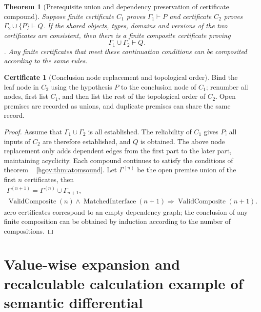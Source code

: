 \documentclass[12pt,a4paper,openany,notitlepage]{report}
\theoremstyle{plain}
\newtheorem{theorem}{Theorem}[chapter]
\theoremstyle{definition}
\newtheorem*{certificate}{Certificate}
\theoremstyle{remark}
\def\mathcal#1{#1}\def\mathsf#1{#1}\def\mathbb#1{#1}%
\begin{document}
\begin{CJK*}
\begin{theorem}
[Prerequisite union and dependency preservation of certificate compound]\label{exp:logic:certificate-composition}
Suppose finite certificate $\mathcal C_1$ proves $\Gamma_1\vdash P$ and certificate $\mathcal C_2$ proves $\Gamma_2\cup\{P\}\vdash Q$. If the shared objects, types, domains and versions of the two certificates are consistent, then there is a finite composite certificate proving \[
 \Gamma_1\cup\Gamma_2\vdash Q.
\]. Any finite certificates that meet these continuation conditions can be composited according to the same rules.\end{theorem}
\begin{certificate}
[Conclusion node replacement and topological order]Bind the leaf node in $\mathcal C_2$ using the hypothesis $P$ to the conclusion node of $\mathcal C_1$; renumber all nodes, first list $\mathcal C_1$, and then list the rest of the topological order of $\mathcal C_2$. Open premises are recorded as unions, and duplicate premises can share the same record.\end{certificate}
\begin{proof}
Assume that $\Gamma_1\cup\Gamma_2$ is all established. The reliability of $\mathcal C_1$ gives $P$; all inputs of $\mathcal C_2$ are therefore established, and $Q$ is obtained. The above node replacement only adds dependent edges from the first part to the later part, maintaining acyclicity. Each compound continues to satisfy the conditions of theorem ~ \ref{hgov:thm:atomsound}. Let $\Gamma^{(n)}$ be the open premise union of the first $n$ certificates, then \[
 \begin{gathered}
 \Gamma^{(n+1)}=\Gamma^{(n)}\cup\Gamma_{n+1},\\
 \operatorname{ValidComposite}(n)\land\operatorname{MatchedInterface}(n+1)
 \Rightarrow\operatorname{ValidComposite}(n+1).
 \end{gathered}
\] zero certificates correspond to an empty dependency graph; the conclusion of any finite composition can be obtained by induction according to the number of compositions.\end{proof}


\section { Value-wise expansion and recalculable calculation example of semantic differential }


\end{CJK*}
\end{document}
